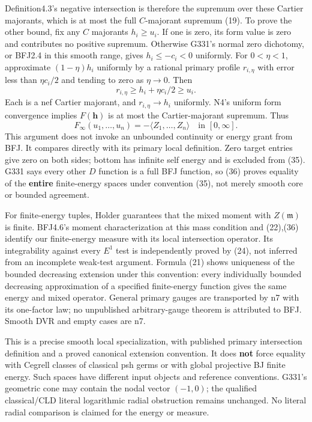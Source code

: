 \documentclass[
  11pt,
]{article}
\begin{document}
Definition4.3's negative intersection is therefore the supremum over
these Cartier majorants, which is at most the full \(C\)-majorant
supremum (19). To prove the other bound, fix any \(C\) majorants
\(h_i\ge u_i\). If one is zero, its form value is zero and contributes
no positive supremum. Otherwise G331's normal zero dichotomy, or BFJ2.4
in this smooth range, gives \(h_i\le-c_i<0\) uniformly. For
\(0<\eta<1\), approximate \((1-\eta)h_i\) uniformly by a rational
primary profile \(r_{i,\eta}\) with error less than \(\eta c_i/2\) and
tending to zero as \(\eta\to0\). Then
\[r_{i,\eta}\ge h_i+\eta c_i/2\ge u_i.\] Each is a nef Cartier majorant,
and \(r_{i,\eta}\to h_i\) uniformly. N4's uniform form convergence
implies \(F(\boldsymbol h)\) is at most the Cartier-majorant supremum.
Thus
\[F_\infty(u_1,\ldots,u_n)=-\langle Z_1,\ldots,Z_n\rangle\quad\text{in }[0,\infty].\tag{36}\]
This argument does not invoke an unbounded continuity or energy grant
from BFJ. It compares directly with its primary local definition. Zero
target entries give zero on both sides; bottom has infinite self energy
and is excluded from (35). G331 says every other \(D\) function is a
full BFJ function, so (36) proves equality of the \textbf{entire}
finite-energy spaces under convention (35), not merely smooth core or
bounded agreement.

For finite-energy tuples, Holder guarantees that the mixed moment with
\(Z(\mathfrak m)\) is finite. BFJ4.6's moment characterization at this
mass condition and (22),(36) identify our finite-energy measure with its
local intersection operator. Its integrability against every \(E^1\)
test is independently proved by (24), not inferred from an incomplete
weak-test argument. Formula (21) shows uniqueness of the bounded
decreasing extension under this convention: every individually bounded
decreasing approximation of a specified finite-energy function gives the
same energy and mixed operator. General primary gauges are transported
by n7 with its one-factor law; no unpublished arbitrary-gauge theorem is
attributed to BFJ. Smooth DVR and empty cases are n7.

This is a precise smooth local specialization, with published primary
intersection definition and a proved canonical extension convention. It
does \textbf{not} force equality with Cegrell classes of classical psh
germs or with global projective BJ finite energy. Such spaces have
different input objects and reference conventions. G331's geometric cone
may contain the nodal vector \((-1,0)\); the qualified classical/CLD
literal logarithmic radial obstruction remains unchanged. No literal
radial comparison is claimed for the energy or measure.
\end{document}
